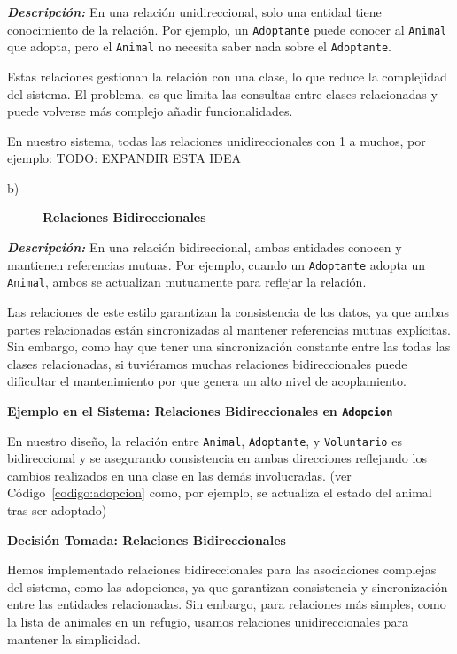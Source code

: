\textit{\textbf{Descripción:}}  
En una relación unidireccional, solo una entidad tiene conocimiento de la relación. 
Por ejemplo, un \texttt{Adoptante} puede conocer al \texttt{Animal} que adopta, 
pero el \texttt{Animal} no necesita saber nada sobre el \texttt{Adoptante}.\par
\vspace{0.15cm} 
Estas relaciones gestionan la relación con una clase, lo que reduce la complejidad del sistema.
El problema, es que limita las consultas entre clases relacionadas y puede volverse más complejo 
añadir funcionalidades.\par
\vspace{0.15cm}
En nuestro sistema, todas las relaciones unidireccionales con 1 a muchos, por ejemplo:
TODO: EXPANDIR ESTA IDEA

\begin{description}
    \item[b)] \textbf{Relaciones Bidireccionales}
\end{description}

\textit{\textbf{Descripción:}}  
En una relación bidireccional, ambas entidades conocen y mantienen referencias mutuas. 
Por ejemplo, cuando un \texttt{Adoptante} adopta un \texttt{Animal}, ambos se actualizan 
mutuamente para reflejar la relación.\par
\vspace{0.15cm}
Las relaciones de este estilo garantizan la consistencia de los datos, ya que ambas partes relacionadas están 
sincronizadas al mantener referencias mutuas explícitas. Sin embargo, como hay que tener una sincronización constante 
entre las todas las clases relacionadas, si tuviéramos muchas relaciones bidireccionales puede dificultar el mantenimiento
por que genera un alto nivel de acoplamiento.\par
\vspace{0.15cm}
\textbf{Ejemplo en el Sistema: Relaciones Bidireccionales en \texttt{Adopcion}}\par 
En nuestro diseño, la relación entre \texttt{Animal}, \texttt{Adoptante}, y 
\texttt{Voluntario} es bidireccional y se asegurando consistencia en ambas direcciones
reflejando los cambios realizados en una clase en las demás involucradas.
(ver Código~\ref{codigo:adopcion} como, por ejemplo, se actualiza el estado del animal tras ser adoptado)\par
\vspace{0.15cm}
\textbf{Decisión Tomada: Relaciones Bidireccionales}\par
Hemos implementado relaciones bidireccionales para las asociaciones complejas del sistema, 
como las adopciones, ya que garantizan consistencia y sincronización entre las entidades 
relacionadas. Sin embargo, para relaciones más simples, como la lista de animales en un 
refugio, usamos relaciones unidireccionales para mantener la simplicidad.

